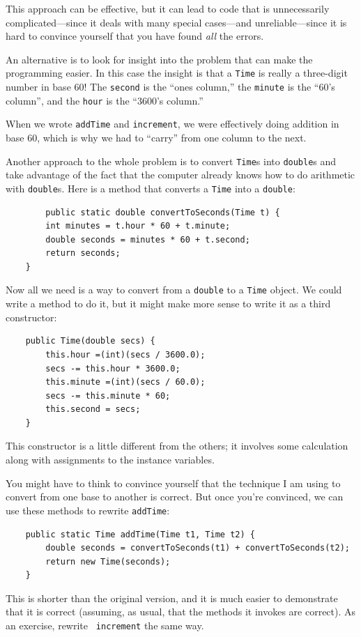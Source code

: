 \documentclass[12pt]{book}
\theoremstyle{exercise}
\begin{document}
This approach can be effective, but it can lead to code
that is unnecessarily complicated---since it deals with many
special cases---and unreliable---since it is hard to convince
yourself that you have found {\em all} the errors.

An alternative is to look for insight
into the problem that can make the programming easier.  In
this case the insight is that a {\tt Time} is really a three-digit
number in base 60!  The {\tt second} is the ``ones column,''
the {\tt minute} is the ``60's column'', and the {\tt hour}
is the ``3600's column.''

When we wrote {\tt addTime} and {\tt increment}, we were effectively
doing addition in base 60, which is why we had to ``carry'' from one
column to the next.


Another approach to the whole problem is to convert
{\tt Time}s into {\tt double}s and take advantage of the fact that
the computer already knows how to do arithmetic with {\tt double}s.
Here is a method that converts a {\tt Time} into a {\tt double}:

\begin{lstlisting}
        public static double convertToSeconds(Time t) {
        int minutes = t.hour * 60 + t.minute;
        double seconds = minutes * 60 + t.second;
        return seconds;
    }
\end{lstlisting}
%
Now all we need is a way to convert from a {\tt double}
to a {\tt Time} object.  We could write a method to
do it, but it might make more sense to write it as a third
constructor:

\begin{lstlisting}
    public Time(double secs) {
        this.hour =(int)(secs / 3600.0);
        secs -= this.hour * 3600.0;
        this.minute =(int)(secs / 60.0);
        secs -= this.minute * 60;
        this.second = secs;
    }
\end{lstlisting}
%
This constructor is a little different from the others;
it involves some calculation along with assignments to the
instance variables.

You might have to think to convince yourself that the technique
I am using to convert from one base to another is correct.  But once
you're convinced, we can use these methods to rewrite {\tt addTime}:

\begin{lstlisting}
    public static Time addTime(Time t1, Time t2) {
        double seconds = convertToSeconds(t1) + convertToSeconds(t2);
        return new Time(seconds);
    }
\end{lstlisting}
%
This is shorter than the original version, and it is much easier
to demonstrate that it is correct (assuming, as usual, that the
methods it invokes are correct).  As an exercise, rewrite {\tt
increment} the same way.
\end{document}
